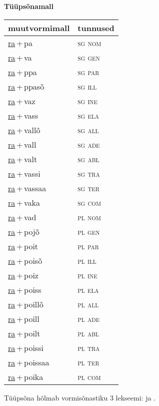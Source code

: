 
\vspace{1.8em}
\begin{minipage}{\textwidth}
\textbf{Tüüpsõnamall \,}\\

\begin{sideways}
\begin{tabular}{l l}
muutvormimall & tunnused \\
\hline
\underline{ra}\,+\,pa & \textsc{ sg nom } \\
\underline{ra}\,+\,va & \textsc{ sg gen } \\
\underline{ra}\,+\,ppa & \textsc{ sg par } \\
\underline{ra}\,+\,ppasõ & \textsc{ sg ill } \\
\underline{ra}\,+\,vaz & \textsc{ sg ine } \\
\underline{ra}\,+\,vass & \textsc{ sg ela } \\
\underline{ra}\,+\,vallõ & \textsc{ sg all } \\
\underline{ra}\,+\,vall & \textsc{ sg ade } \\
\underline{ra}\,+\,valt & \textsc{ sg abl } \\
\underline{ra}\,+\,vassi & \textsc{ sg tra } \\
\underline{ra}\,+\,vassaa & \textsc{ sg ter } \\
\underline{ra}\,+\,vaka & \textsc{ sg com } \\
\underline{ra}\,+\,vad & \textsc{ pl nom } \\
\underline{ra}\,+\,pojõ & \textsc{ pl gen } \\
\underline{ra}\,+\,poit & \textsc{ pl par } \\
\underline{ra}\,+\,poisõ & \textsc{ pl ill } \\
\underline{ra}\,+\,poiz & \textsc{ pl ine } \\
\underline{ra}\,+\,poiss & \textsc{ pl ela } \\
\underline{ra}\,+\,poillõ & \textsc{ pl all } \\
\underline{ra}\,+\,poill & \textsc{ pl ade } \\
\underline{ra}\,+\,poilt & \textsc{ pl abl } \\
\underline{ra}\,+\,poissi & \textsc{ pl tra } \\
\underline{ra}\,+\,poissaa & \textsc{ pl ter } \\
\underline{ra}\,+\,poika & \textsc{ pl com } \\
\end{tabular}
\end{sideways}
\label{tab:tüüpsõnamall-rapa}

\end{minipage}

 
\vspace{1em}
\noindent Tüüpsõna hõlmab vormisõnastiku 3 lekseemi:  ja .
